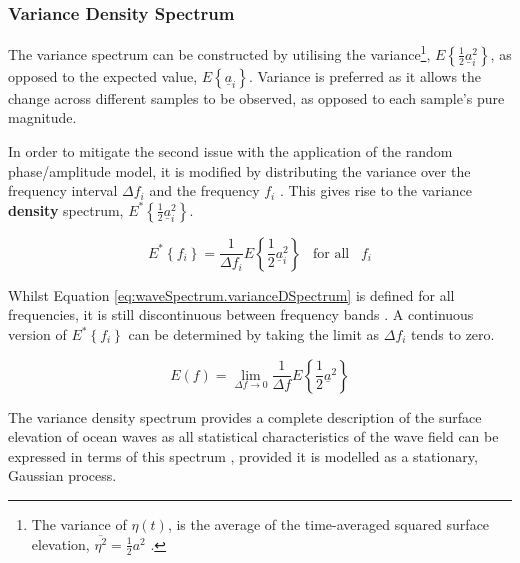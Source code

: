 \subsubsection{Variance Density Spectrum} \label{subsec:theory.waves.waveSpectrum.varianceSpectrum}

The variance spectrum can be constructed by utilising the variance\footnote{The variance of $\eta(t)$, is the average of the time-averaged squared surface elevation, $\overline{\eta^2} = \frac{1}{2}a^2$ \cite{Holthuijsen2007}.}, $E\left \{  \frac{1}{2}\underline{a}^{2}_{i}\right \}$, as opposed to the expected value, $E\left \{  \underline{a}_{i}\right \}$. Variance is preferred as it allows the change across different samples to be observed, as opposed to each sample's pure magnitude.

In order to mitigate the second issue with the application of the random phase/amplitude model, it is modified by distributing the variance over the frequency interval $\Delta f_{i}$ and the frequency $f_{i}$ \cite{Holthuijsen2007}. This gives rise to the variance \textbf{density} spectrum, $E^{*}\left \{ \frac{1}{2}  \underline{a}^{2}_{i}\right \}$.


\begin{equation} \label{eq:waveSpectrum.varianceDSpectrum}
    E^{*}\left \{  f_{i}\right \} = \frac{1}{\Delta f_{i}}E\left \{\frac{1}{2}  \underline{a}^{2}_{i}\right \} \; \; \; \text{for all} \; \; \;  f_{i}
\end{equation}

Whilst Equation \ref{eq:waveSpectrum.varianceDSpectrum} is defined for all frequencies, it is still discontinuous between frequency bands \cite{Holthuijsen2007}. A continuous version of $E^{*}\left \{  f_{i}\right \}$ can be determined by taking the limit as $\Delta f_{i}$ tends to zero.

\begin{equation} \label{eq:waveSpectrum.varianceDSpectrumCont}
    E(f) = \lim_{\Delta f \to 0}\frac{1}{\Delta f}E\left \{ \frac{1}{2} \underline{a}^{2}\right \}
\end{equation}

The variance density spectrum provides a complete description of the surface elevation of ocean waves as all statistical characteristics of the wave field can be expressed in terms of this spectrum \cite{Holthuijsen2007}, provided it is modelled as a stationary, Gaussian process.


